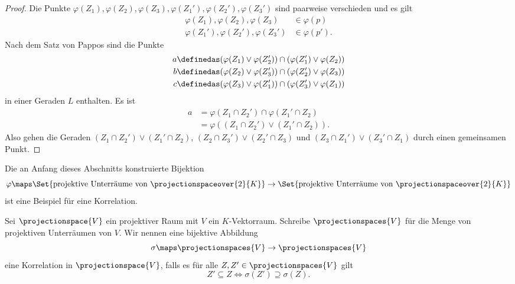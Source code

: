 \begin{proof}
  Die Punkte \( \varphi(Z_1),\varphi(Z_2),\varphi(Z_3),\varphi(Z_1'),\varphi(Z_2'),\varphi(Z_3') \) sind paarweise verschieden und es gilt
  \begin{align*}
    \varphi(Z_1),\varphi(Z_2),\varphi(Z_3)&\in \varphi(p)\\
    \varphi(Z_1'),\varphi(Z_2'),\varphi(Z_3')&\in \varphi(p').
  \end{align*}
  Nach dem Satz von Pappos sind die Punkte
  \begin{align*}
    a&\definedas(\varphi(Z_1)\vee \varphi(Z_2'))\cap (\varphi(Z_1')\vee \varphi(Z_2))\\
    b&\definedas (\varphi(Z_2)\vee \varphi(Z_3'))\cap (\varphi(Z_2')\vee \varphi(Z_3))\\
    c&\definedas (\varphi(Z_3)\vee \varphi(Z_1'))\cap (\varphi(Z_3')\vee \varphi(Z_1))
  \end{align*}
  in einer Geraden \( L \) enthalten. Es ist
  \begin{align*}
    a&=\varphi(Z_1\cap Z_2')\cap \varphi(Z_1'\cap Z_2)\\
    &=\varphi((Z_1\cap Z_2')\vee (Z_1'\cap Z_2)).
  \end{align*}
  Also gehen die Geraden \( (Z_1\cap Z_2')\vee (Z_1'\cap Z_2) \), \( (Z_2\cap Z_3')\vee (Z_2'\cap Z_3) \) und \( (Z_3\cap Z_1')\vee (Z_3'\cap Z_1)\) durch einen gemeinsamen Punkt.
  
\end{proof}
Die an Anfang dieses Abschnitts konstruierte Bijektion
\begin{equation*}
  \varphi\maps \Set{\text{projektive Unterräume von \( \projectionspaceover{2}{K} \)}}\to\Set{\text{projektive Unterräume von \( \projectionspaceover{2}{K} \)}}
\end{equation*}
ist eine Beispiel für eine Korrelation.
\begin{definition*}
  Sei \( \projectionspace{V} \) ein projektiver Raum mit \( V \) ein \( K \)-Vektorraum. Schreibe \( \projectionspaces{V} \) für die Menge von projektiven Unterräumen von \( V \). Wir nennen eine bijektive Abbildung
  \begin{equation*}
    \sigma\maps \projectionspaces{V}\to \projectionspaces{V}
  \end{equation*}
  eine Korrelation in \( \projectionspace{V} \), falls es für alle \( Z,Z'\in \projectionspaces{V} \) gilt
  \begin{equation*}
    Z'\subseteq Z\iff \sigma(Z')\supseteq \sigma(Z).
  \end{equation*}
\end{definition*}
